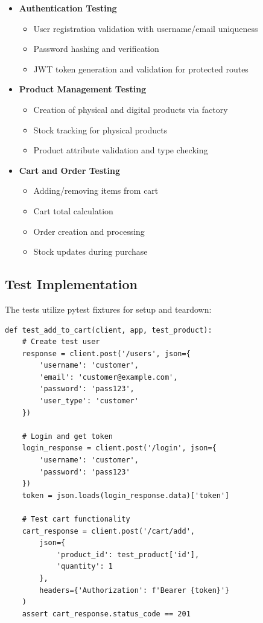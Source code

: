 \documentclass[12pt,a4paper]{article}
\begin{document}
\begin{itemize}
    \item \textbf{Authentication Testing}
    \begin{itemize}
        \item User registration validation with username/email uniqueness
        \item Password hashing and verification
        \item JWT token generation and validation for protected routes
    \end{itemize}

    \item \textbf{Product Management Testing}
    \begin{itemize}
        \item Creation of physical and digital products via factory
        \item Stock tracking for physical products
        \item Product attribute validation and type checking
    \end{itemize}

    \item \textbf{Cart and Order Testing}
    \begin{itemize}
        \item Adding/removing items from cart
        \item Cart total calculation
        \item Order creation and processing
        \item Stock updates during purchase
    \end{itemize}
\end{itemize}

\subsection{Test Implementation}
The tests utilize pytest fixtures for setup and teardown:

\begin{verbatim}
def test_add_to_cart(client, app, test_product):
    # Create test user
    response = client.post('/users', json={
        'username': 'customer',
        'email': 'customer@example.com',
        'password': 'pass123',
        'user_type': 'customer'
    })
    
    # Login and get token
    login_response = client.post('/login', json={
        'username': 'customer',
        'password': 'pass123'
    })
    token = json.loads(login_response.data)['token']
    
    # Test cart functionality
    cart_response = client.post('/cart/add',
        json={
            'product_id': test_product['id'],
            'quantity': 1
        },
        headers={'Authorization': f'Bearer {token}'}
    )
    assert cart_response.status_code == 201
\end{verbatim}
\end{document}
